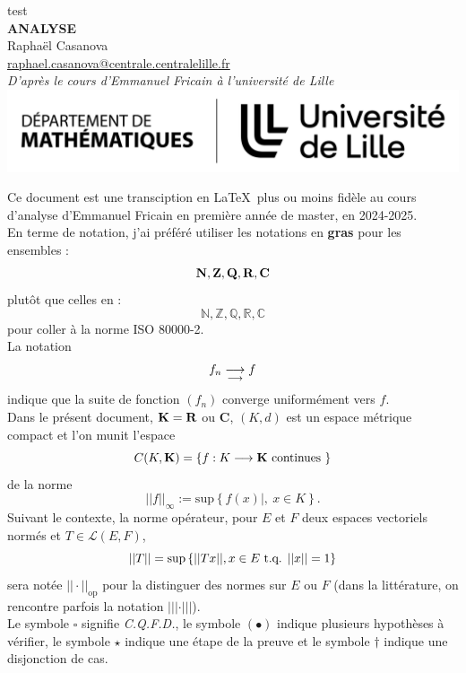 \documentclass[a4paper,11pt, twoside]{article}
\title{}
\author{Raphaël Casanova}
\begin{document}
\pagestyle{empty}
\begin{center}
{\color{white} test}\\
\vspace{5cm}
{\bf \Huge {\YUGE A}NALYSE}\\[1em]
Raphaël Casanova\\
\href{mailto:raphael.casanova@centrale.centralelille.fr}{raphael.casanova@centrale.centralelille.fr}\\[2em]
\emph{D'après le cours d'Emmanuel Fricain à l'université de Lille}\\
\vspace{10cm}
\includegraphics[width=1\textwidth]{lille.pdf}
\end{center}


\newpage


\pagestyle{pageGarde}


\tableofcontents


\newpage


Ce document est une transciption en \LaTeX\ plus ou moins fidèle au cours d'analyse d'Emmanuel Fricain en première année de master, en 2024-2025.\\
En terme de notation, j'ai préféré utiliser les notations en {\bf gras} pour les ensembles : 
$$\mathbf N,\mathbf Z,\mathbf Q,\mathbf R,\mathbf C$$ plutôt que celles en : $$\mathbb N,\mathbb Z, \mathbb Q,\mathbb R,\mathbb C$$ pour coller à la norme ISO 80000-2.\\
La notation 
$$f_n\underset{\longrightarrow}{\longrightarrow} f$$
indique que la suite de fonction $\left(f_n\right)$ converge uniformément vers $f$.\\
Dans le présent document, $\mathbf K=\mathbf R$ ou $\mathbf C$, $(K,d)$ est un espace métrique compact et l'on munit l'espace 
$$C(K,\mathbf K)=\left\{f:K\longrightarrow\mathbf K\text{ continues }\right\}$$
de la norme 
$$||f||_{\infty}:=\mathrm{sup}\left\{f(x)|,\ x\in K\right\}.$$
Suivant le contexte, la norme opérateur, pour $E$ et $F$ deux espaces vectoriels normés et $T\in\mathcal L(E,F)$,
$$||T||=\mathrm{sup}\left\{||T x||, x\in E\text{ t.q. }||x||=1\right\}$$
sera notée $||\cdot||_{\mathrm{op}}$ pour la distinguer des normes sur $E$ ou $F$ (dans la littérature, on rencontre parfois la notation $|||\cdot|||$).\\

Le symbole $\square$ signifie \emph{C.Q.F.D.}, le symbole $(\bullet)$ indique plusieurs hypothèses à vérifier, le symbole $\star$ indique une étape de la preuve et le symbole $\dagger$ indique une disjonction de cas.
\end{document}
